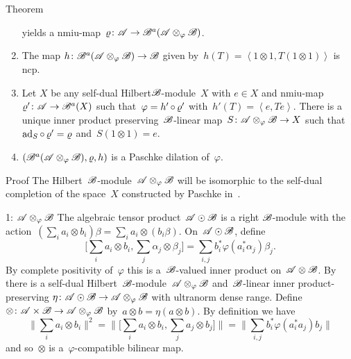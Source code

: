 \documentclass[b]{subfiles}
\begin{document}
\begin{parsec}
\begin{point}{Theorem}
\begin{enumerate}
        yields a
        nmiu-map~$\varrho\colon \mathscr{A} \to \mathscr{B}^a(\mathscr{A}\otimes_\varphi \mathscr{B})$.
\item
    The map
    $h\colon \mathscr{B}^a(\mathscr{A}\otimes_\varphi\mathscr{B}) \to \mathscr{B}$
    given by~$h(T) =\left<1 \otimes 1, T(1 \otimes 1)\right>$
    is ncp.
\item
Let $X$ be any  self-dual Hilbert$\mathscr{B}$-module~$X$ with $e \in X$ and
        nmiu-map~$\varrho'\colon \mathscr{A} \to \mathscr{B}^a(X)$
        such that~$\varphi  = h' \mathop{\circ} \varrho'$
        with~$h'(T) = \left<e,T e\right>$.
There is a unique
        inner product preserving~$\mathscr{B}$-linear
        map~$S \colon \mathscr{A}\otimes_\varphi\mathscr{B} \to X$
        such that~$\mathrm{ad}_S \mathop{\circ} \varrho' = \varrho$
        and~$S( 1\otimes 1) = e$.
\item
$(\mathscr{B}^a(\mathscr{A} \otimes_\varphi \mathscr{B}), \varrho, h)$
    is a Paschke dilation of~$\varphi$.
\end{enumerate}
\begin{point}{Proof}%
The Hilbert~$\mathscr{B}$-module~$\mathscr{A} \otimes_\varphi \mathscr{B}$
    will be isomorphic to the self-dual completion of the space~$X$
    constructed by Paschke in~\cite[Thm.~5.2]{pashcke}.
\begin{point}{1: $\mathscr{A} \otimes_\varphi \mathscr{B}$}%
The algebraic tensor product~$\mathscr{A} \odot \mathscr{B}$
    is a right $\mathscr{B}$-module
with the action~$(\sum_i a_i \otimes b_i)\beta = \sum_i a_i \otimes(b_i\beta)$.
On~$\mathscr{A} \odot \mathscr{B}$, define
\begin{equation*}
    \bigl[\sum_i a_i \otimes b_i, \sum_j \alpha_j \otimes \beta_j\bigr]
    = \sum_{i,j} b_i^* \varphi(a_i^*\alpha_j)\beta_j.
\end{equation*}
By complete positivity of~$\varphi$
this is a~$\mathscr{B}$-valued inner product on~$\mathscr{A} \otimes \mathscr{B}$.
By 
    there is a self-dual Hilbert~$\mathscr{B}$-module~$\mathscr{A}\otimes_\varphi \mathscr{B}$
    and~$\mathscr{B}$-linear inner product-preserving
    $\eta\colon \mathscr{A} \odot \mathscr{B} \to \mathscr{A} \otimes_\varphi \mathscr{B}$
    with ultranorm dense range.
Define~$\otimes \colon \mathscr{A} \times \mathscr{B} \to \mathscr{A} \otimes_\varphi \mathscr{B}$
    by~$a \otimes b = \eta(a \otimes b)$.
By definition we have
\begin{equation*}
\bigl\| \sum_i a_i \otimes b_i \bigr\|^2
    = \bigl\|\bigl[ \sum_i a_i\otimes b_i, \sum_j a_j \otimes b_j \bigr]\bigr\|
    = \bigl\|\sum_{i,j} b_i^* \varphi(a_i^*a_j) b_j\bigr\|
\end{equation*}
and so~$\otimes$ is a~$\varphi$-compatible bilinear map.


\end{point}
\end{point}
\end{point}
\end{parsec}
\end{document}
